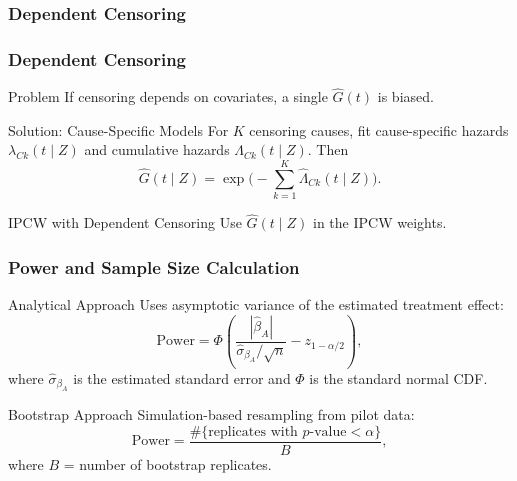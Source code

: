 \documentclass{beamer}
\begin{document}
\begin{frame}
\frametitle{Dependent Censoring}

\frametitle{Dependent Censoring \citep{robins2000}}

\begin{block}{Problem}
If censoring depends on covariates, a single $\widehat{G}(t)$ is biased.
\end{block}

\begin{block}{Solution: Cause-Specific Models}
For $K$ censoring causes, fit cause-specific hazards $\lambda_{Ck}(t \mid Z)$ and cumulative hazards $\Lambda_{Ck}(t \mid Z)$.  
Then
\[
\widehat{G}(t \mid Z) = \exp\!\Big(-\sum_{k=1}^K \widehat{\Lambda}_{Ck}(t \mid Z)\Big).
\]
\end{block}

\begin{block}{IPCW with Dependent Censoring}
Use $\widehat{G}(t \mid Z)$ in the IPCW weights.
\end{block}

\end{frame}

\begin{frame}
\frametitle{Power and Sample Size Calculation}


\begin{block}{Analytical Approach}
Uses asymptotic variance of the estimated treatment effect:
\[
\text{Power} = 
\Phi\!\left( 
\frac{|\widehat{\beta}_A|}{\widehat{\sigma}_{\beta_A}/\sqrt{n}} - z_{1-\alpha/2}
\right),
\]
where $\widehat{\sigma}_{\beta_A}$ is the estimated standard error and $\Phi$ is the standard normal CDF.
\end{block}

\begin{block}{Bootstrap Approach}
Simulation-based resampling from pilot data:
\[
\text{Power} =
\frac{\#\{\text{replicates with $p$-value} < \alpha\}}{B},
\]
where $B$ = number of bootstrap replicates.
\end{block}

\end{frame}
\end{document}
